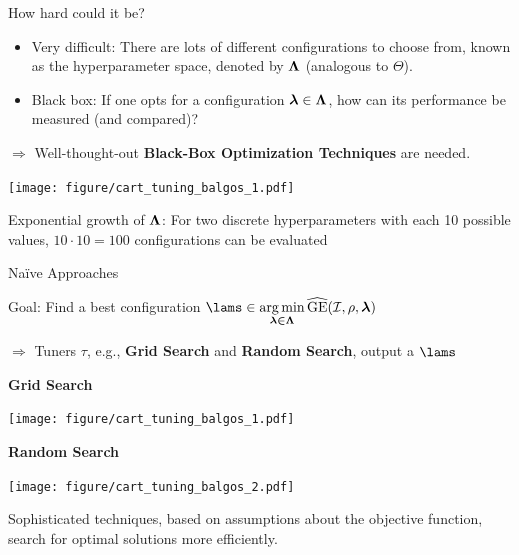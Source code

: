 \documentclass[11pt,compress,t,notes=noshow, xcolor=table]{beamer}
\begin{document}
\begin{vbframe}{How hard could it be?}
\begin{itemize}
\item \small Very difficult: There are lots of different configurations to choose from, known as the hyperparameter space, denoted by $\bm{\Lambda}$ (analogous to $\Theta$).
\item \small Black box: If one opts for a configuration $\bm{\lambda} \in \bm{\Lambda}$, how can its performance be measured (and compared)?
\end{itemize}

$\Rightarrow$ Well-thought-out \textbf{Black-Box Optimization Techniques} are needed.

\begin{center}
\vspace{2em}
\texttt{[image: figure/cart\_tuning\_balgos\_1.pdf]}
\end{center}

\begin{center}
\scriptsize Exponential growth of $\bm{\Lambda}$: For two discrete hyperparameters with each 10 possible values, $10 \cdot 10 = 100$ configurations can be evaluated
\end{center}

\end{vbframe}



\begin{vbframe}{Naïve Approaches}

Goal: Find a best configuration $\lams \in \argmin \limits_{\boldsymbol{\lambda \in \Lam}} \widehat{\mathrm{GE}}(\ind, \rho, \lamv) $

$\Rightarrow$ Tuners $\tau$, e.g., \textbf{Grid Search} and \textbf{Random Search}, output a $\lams$

\vspace{2em}

\begin{minipage}{0.51\textwidth}
\begin{center}
\textbf{Grid Search}
\end{center}

\texttt{[image: figure/cart\_tuning\_balgos\_1.pdf]}
\end{minipage}
\begin{minipage}{0.48\textwidth}
\begin{center}
\textbf{Random Search}
\end{center}

\texttt{[image: figure/cart\_tuning\_balgos\_2.pdf]}
\end{minipage}

\vspace{4em}
\small Sophisticated techniques, based on assumptions about the objective function, search for optimal solutions more efficiently.
\end{vbframe}
\end{document}
